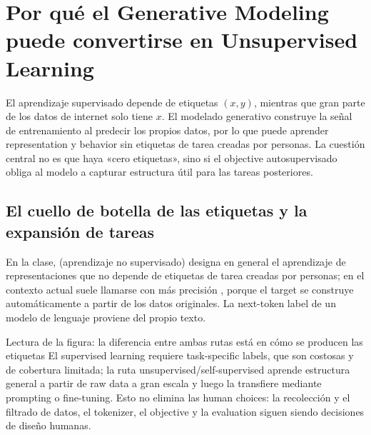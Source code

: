 \section{Por qué el Generative Modeling puede convertirse en Unsupervised Learning}

El aprendizaje supervisado depende de etiquetas $(x,y)$, mientras que gran parte de los datos de internet solo tiene $x$. El modelado generativo construye la señal de entrenamiento al predecir los propios datos, por lo que puede aprender representation y behavior sin etiquetas de tarea creadas por personas. La cuestión central no es que haya «cero etiquetas», sino si el objective autosupervisado obliga al modelo a capturar estructura útil para las tareas posteriores.

\subsection{El cuello de botella de las etiquetas y la expansión de tareas}

En la clase,  (aprendizaje no supervisado) designa en general el aprendizaje de representaciones que no depende de etiquetas de tarea creadas por personas; en el contexto actual suele llamarse con más precisión , porque el target se construye automáticamente a partir de los datos originales. La next-token label de un modelo de lenguaje proviene del propio texto.


\begin{knowledgebox}{Lectura de la figura: la diferencia entre ambas rutas está en cómo se producen las etiquetas}
El supervised learning requiere task-specific labels, que son costosas y de cobertura limitada; la ruta unsupervised/self-supervised aprende estructura general a partir de raw data a gran escala y luego la transfiere mediante prompting o fine-tuning. Esto no elimina las human choices: la recolección y el filtrado de datos, el tokenizer, el objective y la evaluation siguen siendo decisiones de diseño humanas.
\end{knowledgebox}


